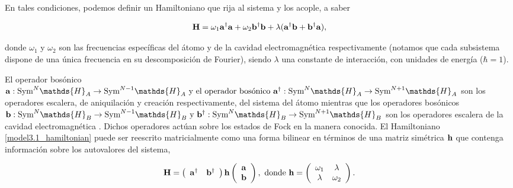 \documentclass{report} %
\numberwithin{equation}{section}
\begin{document}
En tales condiciones, podemos definir un Hamiltoniano que rija al sistema y los acople, a saber

\begin{equation}
    \mathbf{H} = \omega_1 {\bf a}^{\dagger}{\bf a} + \omega_2 {\mathbf b}^{\dagger}{\mathbf b} + \lambda({\bf a}^{\dagger}{\mathbf b}+ {\mathbf b}^{\dagger}{\bf a}),
    \label{model3.1_hamiltonian}
\end{equation}

donde $\omega_1$ y $\omega_2$ son las frecuencias específicas del átomo y de la cavidad electromagnética respectivamente (notamos que cada subsistema dispone de una única frecuencia en su descomposición de Fourier), siendo $\lambda$ una constante de interacción, con unidades de energía ($\hbar = 1$). 

El operador bosónico ${\bf a}:\textnormal{Sym}^{N} \mathds{H}_A \rightarrow \textnormal{Sym}^{N-1} \mathds{H}_A \textnormal{ y el operador bosónico }{\bf a}^{\dagger}: \textnormal{Sym}^{N}\mathds{H}_A \rightarrow \textnormal{Sym}^{N+1}\mathds{H}_A$
son los operadores escalera, de aniquilación y creación respectivamente, del sistema del átomo mientras que los operadores bosónicos ${\bf b}:\textnormal{Sym}^{N} \mathds{H}_B \rightarrow \textnormal{Sym}^{N-1} \mathds{H}_B \textnormal{ y }{\bf b}^{\dagger}: \textnormal{Sym}^{N}\mathds{H}_B \rightarrow \textnormal{Sym}^{N+1}\mathds{H}_B$ son los operadores escalera de la cavidad electromagnética \cite{CohenTannoudji1989}. Dichos operadores actúan sobre los estados de Fock en la manera conocida.  
El Hamiltoniano \eqref{model3.1_hamiltonian} puede ser reescrito matricialmente como una forma bilinear en términos de una matriz simétrica ${\bf h}$ que contenga información sobre los autovalores del sistema, 

\begin{align}
    {\bf H} = \left(  \begin{array}{cr}
       {\bf a}^{\dagger}  & {\mathbf b}^{\dagger} \\
    \end{array} \right) 
        {\bf h} 
    \left( \begin{array}{c}
         {\bf a} \\
         {\mathbf b} 
    \end{array} \right), \textnormal{ donde } {\bf h} = \left( \begin{array}{cc}
        \omega_1 & \lambda\\ \lambda & \omega_2 
    \end{array} \right).
\end{align}
\end{document}
